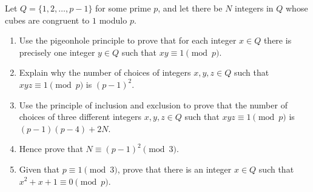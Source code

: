 \begin{prbm}
Let $Q=\{1,2,\dots,p-1\}$ for some prime $p$, and let there be $N$ integers in $Q$ whose cubes are congruent to $1$ modulo $p$.
\begin{enumerate}[label=(\alph*)]
\item Use the pigeonhole principle to prove that for each integer $x\in Q$ there is precisely one integer $y\in Q$ such that $xy\equiv1\pmod p$.
\item Explain why the number of choices of integers $x,y,z\in Q$ such that $xyz\equiv1\pmod p$ is $(p-1)^2$.
\item Use the principle of inclusion and exclusion to prove that the number of choices of three different integers $x,y,z\in Q$ such that $xyz\equiv1\pmod p$ is $(p-1)(p-4)+2N$.
\item Hence prove that $N\equiv(p-1)^2\pmod 3$.
\item Given that $p\equiv1\pmod3$, prove that there is an integer $x\in Q$ such that $x^2+x+1\equiv0\pmod p$.
\end{enumerate}
\end{prbm}

